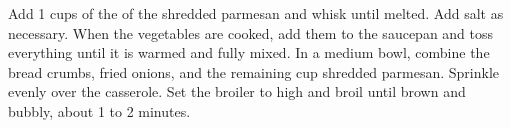 \begin{recipe}
{	\step Add 1  cups of the of the shredded parmesan and whisk until melted. Add salt as necessary.
	\step When the vegetables are cooked, add them to the saucepan and toss everything until it is warmed and fully mixed.
	\step In a medium bowl, combine the bread crumbs, fried onions, and the remaining  cup shredded parmesan. Sprinkle evenly over the casserole.
	\step Set the broiler to high and broil until brown and bubbly, about 1 to 2 minutes.
}
\end{recipe}
